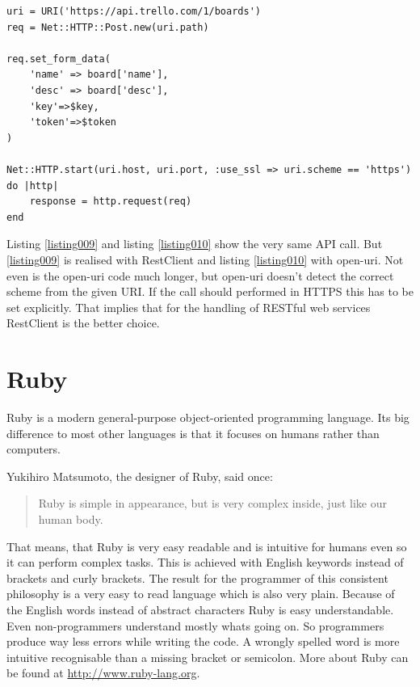 \begin{lstlisting}[aboveskip=1\baselineskip, caption=POST request with open-uri., label=listing010]
uri = URI('https://api.trello.com/1/boards')
req = Net::HTTP::Post.new(uri.path)

req.set_form_data(
	'name' => board['name'], 
	'desc' => board['desc'],
	'key'=>$key,
	'token'=>$token
)

Net::HTTP.start(uri.host, uri.port, :use_ssl => uri.scheme == 'https') do |http|
	response = http.request(req)
end
\end{lstlisting}

Listing \ref{listing009} and listing \ref{listing010} show the very same API call. But \ref{listing009} is realised with RestClient and listing \ref{listing010} with open-uri. Not even is the open-uri code much longer, but open-uri doesn't detect the correct scheme from the given URI. If the call should performed in HTTPS this has to be set explicitly. That implies that for the handling of RESTful web services RestClient is the better choice.


\section{Ruby}
Ruby is a modern general-purpose object-oriented programming language. Its big difference to most other languages is that it focuses on humans rather than computers. 

Yukihiro Matsumoto, the designer of Ruby, said once:
\begin{quote}
Ruby is simple in appearance, but is very
complex inside, just like our human body.\cite{ruby:talk}
\end{quote}

That means, that Ruby is very easy readable and is intuitive for humans even so it can perform complex tasks. This is achieved with English keywords instead of brackets and curly brackets. The result for the programmer of this consistent philosophy is a very easy to read language which is also very plain. Because of the English words instead of abstract characters Ruby is easy understandable. Even non-programmers understand mostly whats going on. So programmers produce way less errors while writing the code. A wrongly spelled word is more intuitive recognisable than a missing bracket or semicolon. \cite{ruby:about} More about Ruby can be found at \url{http://www.ruby-lang.org}.

